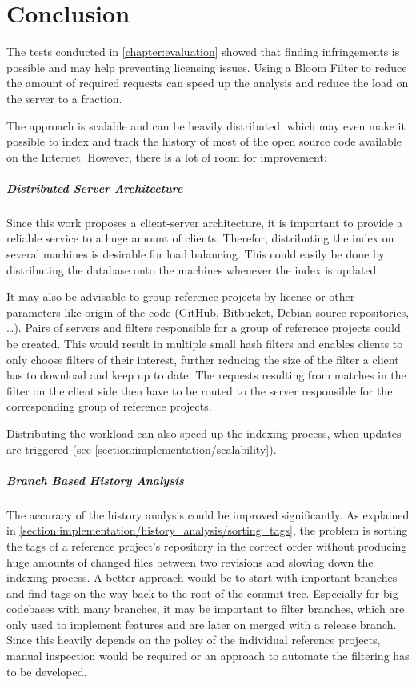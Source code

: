 
\chapter{Conclusion}\label{chapter:conclusion}
The tests conducted in \autoref{chapter:evaluation} showed that finding infringements is possible and may help preventing licensing issues.
Using a Bloom Filter to reduce the amount of required requests can speed up the analysis and reduce the load on the server to a fraction.

The approach is scalable and can be heavily distributed, which may even make it possible to index and track the history of most of the open source code available on the Internet.
However, there is a lot of room for improvement:

\paragraph{Distributed Server Architecture}
Since this work proposes a client-server architecture, it is important to provide a reliable service to a huge amount of clients.
Therefor, distributing the index on several machines is desirable for load balancing.
This could easily be done by distributing the database onto the machines whenever the index is updated.

It may also be advisable to group reference projects by license or other parameters like origin of the code (GitHub, Bitbucket, Debian source repositories, \dots).
Pairs of servers and filters responsible for a group of reference projects could be created.
This would result in multiple small hash filters and enables clients to only choose filters of their interest, further reducing the size of the filter a client has to download and keep up to date.
The requests resulting from matches in the filter on the client side then have to be routed to the server responsible for the corresponding group of reference projects.

Distributing the workload can also speed up the indexing process, when updates are triggered (see \autoref{section:implementation/scalability}).

\paragraph{Branch Based History Analysis}
The accuracy of the history analysis could be improved significantly.
As explained in \autoref{section:implementation/history_analysis/sorting_tags}, the problem is sorting the tags of a reference project's repository in the correct order without producing huge amounts of changed files between two revisions and slowing down the indexing process.
A better approach would be to start with important branches and find tags on the way back to the root of the commit tree.
Especially for big codebases with many branches, it may be important to filter branches, which are only used to implement features and are later on merged with a release branch.
Since this heavily depends on the policy of the individual reference projects, manual inspection would be required or an approach to automate the filtering has to be developed.

